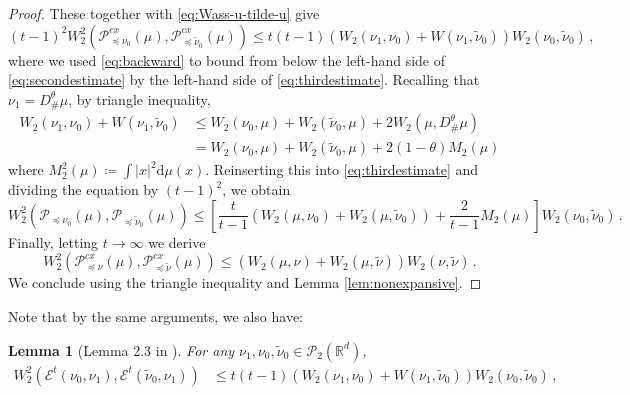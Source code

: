 \documentclass[12pt]{amsart}
\def\ed{\mathrm{d}}
\def\mc#1{\mathcal{#1}}
\newtheorem{lemma}{Lemma}
\begin{document}
\begin{proof}
These  together with \eqref{eq:Wass-u-tilde-u} give
\begin{equation}\label{eq:thirdestimate}
    (t-1)^2W_2^2(\mathscr{P}^{cx}_{\preceq \nu_0}(\mu),\mathscr{P}^{cx}_{\preceq \tilde{\nu}_0}(\mu)) \leq t (t-1) (W_2(\nu_1,\nu_0) + W(\nu_1,\tilde{\nu}_0))W_2(\nu_0,\tilde{\nu}_0)\,,
\end{equation}
where we used \eqref{eq:backward} to bound from below the left-hand side of \eqref{eq:secondestimate} by the left-hand side of \eqref{eq:thirdestimate}. Recalling that $\nu_1 = D^\theta_\#\mu$, by triangle inequality,
\[
\begin{aligned}
    W_2(\nu_1,\nu_0) + W(\nu_1,\tilde{\nu}_0) 
    &\leq  W_2(\nu_0,\mu) +W_2(\tilde{\nu}_0,\mu)+ 2W_2(\mu,D^\theta_\#\mu)\\
    &= W_2(\nu_0,\mu) +W_2(\tilde{\nu}_0,\mu)+2(1-\theta) M_2(\mu)
\end{aligned}
\]
where $M_2^2(\mu) \coloneqq \int |x|^2\ed \mu(x)$.
Reinserting this into \eqref{eq:thirdestimate} and dividing the equation by $(t-1)^2$, we obtain
\[
W_2^2(\mathscr{P}_{\preceq \nu_0}(\mu),\mathscr{P}_{\preceq \tilde{\nu}_0}(\mu)) \leq \left[\frac{t}{t-1}(W_2(\mu,\nu_0) + W_2(\mu,\tilde{\nu}_0)) +\frac{2}{t-1} M_2(\mu)\right] W_2(\nu_0,\tilde{\nu}_0)\,.
\]
Finally, letting $t\rightarrow \infty$ we derive 
\[
W_2^2(\mathscr{P}_{\preceq \nu}^{cx}(\mu),\mathscr{P}_{\preceq \tilde{\nu}}^{cx}(\mu))\leq (W_2(\mu,\nu) + W_2(\mu,\tilde{\nu}))W_2(\nu,\tilde{\nu})\,.
\]
We conclude using the triangle inequality and Lemma \ref{lem:nonexpansive}.
\end{proof}




Note that by the same arguments, we also have:



\begin{lemma}[Lemma 2.3 in \cite{Gallouet2025}]\label{lem:extraholder}
For any $\nu_1,\nu_0,\tilde{\nu}_0\in\mc{P}_2(\mathbb{R}^d)$,
\[
\begin{aligned}
    W_2^2(\mathscr{E}^t(\nu_0,\nu_1),\mathscr{E}^t(\tilde{\nu}_0,\nu_1)) &\leq  t (t-1) (W_2(\nu_1,\nu_0) + W(\nu_1,\tilde{\nu}_0))W_2(\nu_0,\tilde{\nu}_0)\,,
\end{aligned}
\]
\end{lemma}
\end{document}
